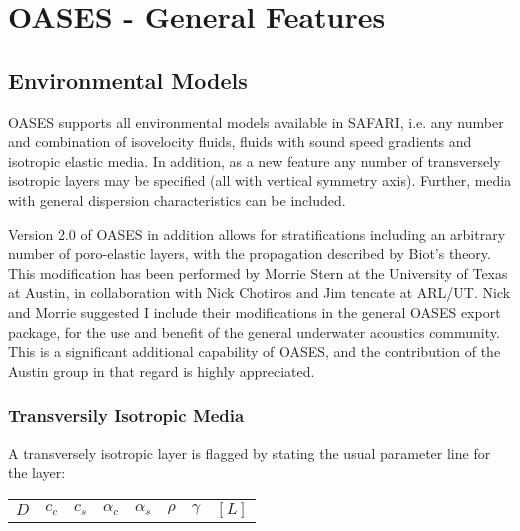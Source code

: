 \section{OASES - General Features}

\subsection{Environmental Models}
\label{oas_env}
    OASES supports all environmental models available in  SAFARI,
i.e.  any  number and combination of isovelocity  fluids,  fluids
with  sound  speed  gradients and  isotropic  elastic  media.  In
addition,  as a new feature any number of transversely  isotropic
layers may be specified  (all with vertical symmetry axis). Further,
media with general dispersion characteristics can be included.

Version 2.0 of OASES in addition allows for stratifications including
an arbitrary number of poro-elastic layers, with the propagation
described by Biot's theory. This modification has been performed by
Morrie Stern \cite{stern} at the University of Texas at Austin,
in collaboration
with Nick Chotiros and Jim tencate at ARL/UT. Nick and Morrie
suggested I include their modifications in the general OASES export
package, for the use and benefit of the general underwater acoustics
community. This is a significant additional capability of OASES, and
the contribution of the Austin group in that regard is highly
appreciated.

\subsubsection{Transversily Isotropic Media}

    A  transversely  isotropic layer is flagged  by  stating  the
usual parameter line for the layer:

\begin{tabular}{cccccccc}
    $D$ &    $c_c$ & $c_s$ & $\alpha_c$ & $\alpha_s$ &  $\rho$ &
$\gamma$ & $ [L] $
\end{tabular}

